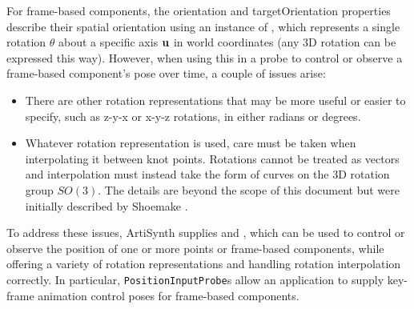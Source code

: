 For frame-based components, the {\sf orientation} and {\sf targetOrientation}
properties describe their spatial orientation using an instance of
, which represents
a single rotation $\theta$ about a specific axis ${\bf u}$ in world coordinates (any
3D rotation can be expressed this way). However, when using this in a probe to
control or observe a frame-based component's pose over time, a couple
of issues arise:

\begin{itemize}

\item There are other rotation representations that may be more
useful or easier to specify, such as z-y-x or x-y-z rotations,
in either radians or degrees.

\item Whatever rotation representation is used, care must be taken
when interpolating it between knot points. Rotations cannot be treated as
vectors and interpolation must instead take the form of curves on the 3D
rotation group $SO(3)$. The details are beyond the scope of this document but
were initially described by Shoemake \cite{shoemake1985animating}.

\end{itemize}

To address these issues, ArtiSynth supplies
 and
, which can be used to control or
observe the position of one or more points or frame-based components, while
offering a variety of rotation representations and handling rotation
interpolation correctly. In particular, {\tt PositionInputProbe}s
allow an application to supply key-frame animation control poses for
frame-based components.

